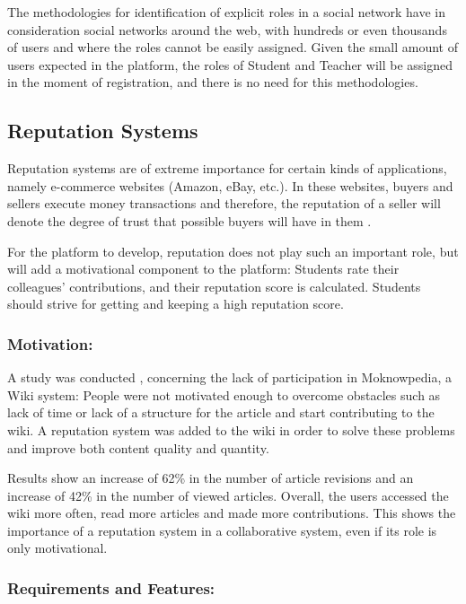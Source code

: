 \documentclass{llncs}
\begin{document}
The methodologies for identification of explicit roles in a social network \cite{zhang2007expertise,agarwal2008identifying} have in consideration social networks around the web, with hundreds or even thousands of users and where the roles cannot be easily assigned. Given the small amount of users expected in the platform, the roles of Student and Teacher will be assigned in the moment of registration, and there is no need for this methodologies.

\subsection{Reputation Systems}
\label{repsys}
Reputation systems are of extreme importance for certain kinds of applications, namely e-commerce websites (Amazon, eBay, etc.). In these websites, buyers and sellers execute money transactions and therefore, the reputation of a seller will denote the degree of trust that possible buyers will have in them \cite{vavilis2014reference}.

For the platform to develop, reputation does not play such an important role, but will add a motivational component to the platform: Students rate their colleagues' contributions, and their reputation score is calculated. Students should strive for getting and keeping a high reputation score.

\subsubsection{Motivation:}

A study was conducted \cite{dencheva2011dynamic}, concerning the lack of participation in Moknowpedia, a Wiki system: People were not motivated enough to overcome obstacles such as lack of time or lack of a structure for the article and start contributing to the wiki. A reputation system was added to the wiki in order to solve these problems and improve both content quality and quantity\cite{prause2008approach}. 

Results show an increase of 62\% in the number of article revisions and an increase of 42\% in the number of viewed articles. Overall, the users accessed the wiki more often, read more articles and made more contributions. This shows the importance of a reputation system in a collaborative system, even if its role is only motivational.
	
\subsubsection{Requirements and Features:}
\end{document}
